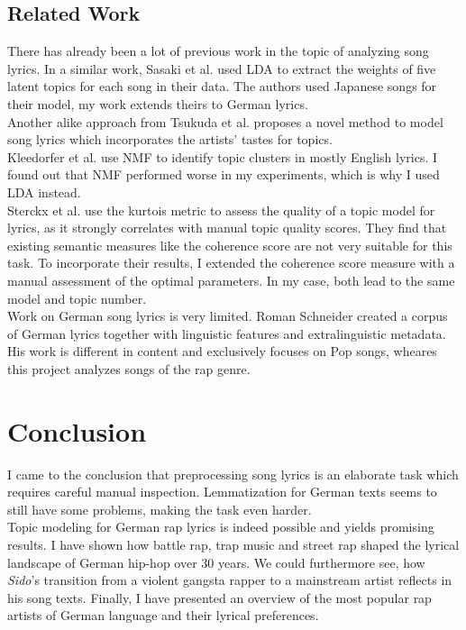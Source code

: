 \documentclass[conference]{IEEEtran}
\begin{document}
\subsection{Related Work}
There has already been a lot of previous work in the topic of analyzing song lyrics. In a similar work, Sasaki et al. \cite{sasaki} used LDA to extract the weights of five latent topics for each song in their data. The authors used Japanese songs for their model, my work extends theirs to German lyrics.\\
Another alike approach from Tsukuda et al. \cite{tsukuda} proposes a novel method to model song lyrics which incorporates the artists' tastes for topics.\\
Kleedorfer et al. \cite{kleedorfer} use NMF to identify topic clusters in mostly English lyrics. I found out that NMF performed worse in my experiments, which is why I used LDA instead.\\
Sterckx et al. \cite{sterckx} use the kurtois metric to assess the quality of a topic model for lyrics, as it strongly correlates with manual topic quality scores. They find that existing semantic measures like the coherence score are not very suitable for this task. To incorporate their results, I extended the coherence score measure with a manual assessment of the optimal parameters. In my case, both lead to the same model and topic number.\\
Work on German song lyrics is very limited. Roman Schneider \cite{schneider} created a corpus of German lyrics together with linguistic features and extralinguistic metadata. His work is different in content and exclusively focuses on Pop songs, wheares this project analyzes songs of the rap genre.

\section{Conclusion}
I came to the conclusion that preprocessing song lyrics is an elaborate task which requires careful manual inspection. Lemmatization for German texts seems to still have some problems, making the task even harder.\\
Topic modeling for German rap lyrics is indeed possible and yields promising results. I have shown how battle rap, trap music and street rap shaped the lyrical landscape of German hip-hop over 30 years. We could furthermore see, how \textit{Sido}'s transition from a violent gangsta rapper to a mainstream artist reflects in his song texts. Finally, I have presented an overview of the most popular rap artists of German language and their lyrical preferences.

{
\balance{
  
  
  }
}
\end{document}

